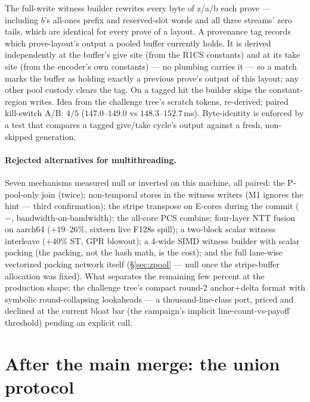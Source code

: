 \documentclass[11pt]{article}
\begin{document}
The full-write witness builder rewrites every byte of z/a/b each prove ---
including $b$'s all-ones prefix and reserved-slot words and all three
streams' zero tails, which are identical for every prove of a layout. A
provenance tag records which prove-layout's output a pooled buffer
currently holds. It is derived independently at the buffer's give site
(from the R1CS constants) and at its take site (from the encoder's own
constants) --- no plumbing carries it --- so a match marks the buffer as
holding exactly a previous prove's output of this layout; any other pool
custody clears the tag. On a tagged hit the builder skips the
constant-region writes. Idea from the challenge tree's scratch tokens,
re-derived; paired kill-switch A/B: $4/5$ ($147.0$--$149.0$ vs
$148.3$--$152.7$\,ms). Byte-identity is enforced by a test that compares
a tagged give/take cycle's output against a fresh, non-skipped
generation.

\paragraph{Rejected alternatives for multithreading.}
Seven mechanisms measured null or inverted on this machine, all paired:
the P-pool-only join (twice); non-temporal stores in the witness writers
(M1 ignores the hint --- third confirmation); the stripe transpose on
E-cores during the commit ($-$, bandwidth-on-bandwidth); the all-core PCS
combine; four-layer NTT fusion on aarch64 ($+19$--$26\%$, sixteen live
F128s spill); a two-block scalar witness interleave ($+40\%$ ST, GPR
blowout); a 4-wide SIMD witness builder with scalar packing (the
packing, not the hash math, is the cost); and the full lane-wise
vectorized packing network itself (\S\ref{sec:zpool} --- null once the
stripe-buffer allocation was fixed). What separates the remaining few
percent at the production shape: the challenge tree's compact round-2
anchor+delta format with symbolic round-collapsing lookaheads --- a
thousand-line-class port, priced and declined at the current bloat bar
(the campaign's implicit line-count-vs-payoff threshold) pending an
explicit call.

\section{After the main merge: the union protocol}\label{sec:union}
\end{document}

